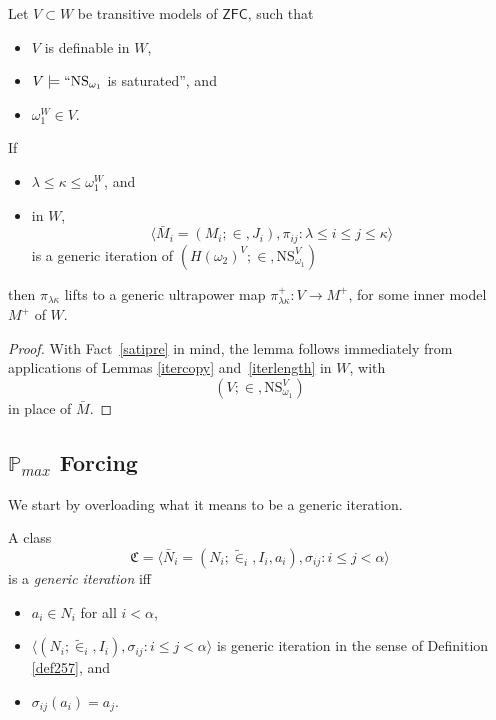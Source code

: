 \documentclass[12pt]{article}
\numberwithin{equation}{section}
\begin{document}
\begin{lem}\label{lift}
Let $V \subset W$ be transitive models of $\mathsf{ZFC}$, such that 
\begin{itemize}
    \item $V$ is definable in $W$,
    \item $V \models ``\mathrm{NS}_{\omega_1}$ is saturated'', and
    \item $\omega_1^W \in V$.
\end{itemize}
If 
\begin{itemize}
    \item $\lambda \leq \kappa \leq \omega_1^W$, and
    \item in $W$, $$\langle \bar{M}_i = (M_i; \in, J_i), \pi_{ij} : \lambda \leq i \leq j \leq \kappa \rangle$$ is a generic iteration of $(H(\omega_2)^V; \in, \mathrm{NS}_{\omega_1}^V)$
\end{itemize}
then $\pi_{\lambda \kappa}$ lifts to a generic ultrapower map $\pi^{+}_{\lambda \kappa} : V \longrightarrow M^+$, for some inner model $M^+$ of $W$.
\end{lem}
\begin{proof}
With Fact~\ref{satipre} in mind, the lemma follows immediately from applications of Lemmas \ref{itercopy} and~\ref{iterlength} in $W$, with $$(V; \in, \mathrm{NS}_{\omega_1}^V)$$ in place of $\bar{M}$.
\end{proof}

\subsection{\texorpdfstring{$\mathbb{P}_{max}$}{P-max} Forcing}\label{ss27}

We start by overloading what it means to be a generic iteration.

\begin{defi}\label{def269}
A class
\begin{equation*}
    \mathfrak{C} = \langle \bar{N}_i = (N_i; \tilde{\in}_i, I_i, a_i), \sigma_{ij} : i \leq j < \alpha \rangle
\end{equation*}
is a \emph{generic iteration} iff
\begin{itemize}
    \item $a_i \in N_i$ for all $i < \alpha$,
    \item $\langle (N_i; \tilde{\in}_i, I_i), \sigma_{ij} : i \leq j < \alpha \rangle$ is generic iteration in the sense of Definition \ref{def257}, and
    \item $\sigma_{ij}(a_i) = a_j$.
\end{itemize}
\end{defi}
\end{document}
